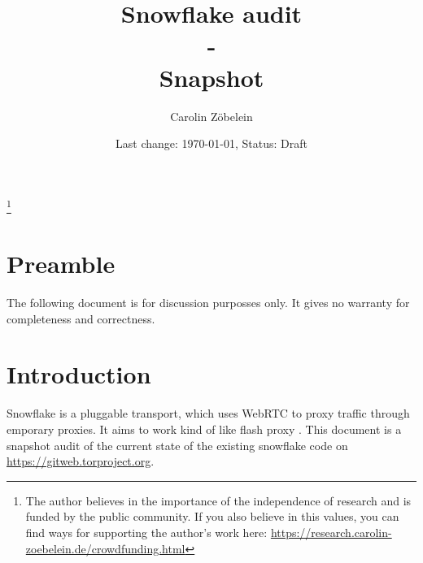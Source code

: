 \documentclass{amsart}
\theoremstyle{definition}
\theoremstyle{remark}
\numberwithin{equation}{section}
\begin{document}
\title{Snowflake audit\\ -\\ \small{Snapshot}}
\author{Carolin Z\"obelein}
\address{Carolin Z\"obelein, Independent mathematical scientist, Josephsplatz 8, 90403 N\"urnberg, Germany, \url{https://research.carolin-zoebelein.de}}
\thanks{The author believes in the importance of the independence of research and is funded by the public community. If you also believe in this values, you can find ways for supporting the author's work here: \url{https://research.carolin-zoebelein.de/crowdfunding.html}}
\date{Last change: \today, Status: Draft}
\maketitle
\section*{Preamble}
\label{s:preamble}
The following document is for discussion purposses only. It gives no warranty for completeness and correctness.
\section{Introduction}
\label{s:introduction}
Snowflake  is a pluggable transport, which uses WebRTC to proxy traffic through emporary proxies. It aims to work kind of like flash proxy \cite{SnowflakeEmail} \cite{SnowflakeGitWeb}. This document is a snapshot audit of the current state of the existing snowflake code  \cite{SnowflakeGit} on \url{https://gitweb.torproject.org}.
\end{document}
